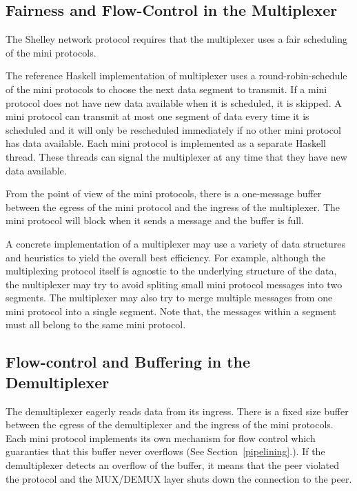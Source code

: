 \documentclass{report}
\newcommand{\hide}[1]{}
\theoremstyle{definition}{
  \newtheorem{lemma}{Lemma}[section] %
  \newtheorem{definition}[lemma]{Definition}
}
\theoremstyle{theorem}{
  \newtheorem{invariant}[lemma]{Invariant}
  \newtheorem{proofobligation}[lemma]{Proof Obligation}
}
\numberwithin{equation}{lemma}
\begin{document}
\subsection{Fairness and Flow-Control in the Multiplexer}
The Shelley network protocol requires that the multiplexer uses a fair scheduling of the mini protocols.

The reference Haskell implementation of multiplexer uses a round-robin-schedule of the mini protocols
to choose the next data segment to transmit.
If a mini protocol does not have new data available when it is scheduled, it is skipped.
A mini protocol can transmit at most one segment of data every time it is scheduled
and it will only be rescheduled immediately if no other mini protocol has data available.
Each mini protocol is implemented as a separate Haskell thread.
These threads can signal the multiplexer at any time that they have new data available.

From the point of view of the mini protocols, there is a one-message buffer between the egress of
the mini protocol and the ingress of the multiplexer.
The mini protocol will block when it sends a message and the buffer is full.

A concrete implementation of a multiplexer may use a variety of data structures and heuristics to
yield the overall best efficiency.
For example, although the multiplexing protocol itself is agnostic to the underlying structure of
the data, the multiplexer may try to avoid spliting small mini protocol messages into two segments.
The multiplexer may also try to merge multiple messages from one mini protocol into a
single segment.
Note that, the messages within a segment must all belong to the same mini protocol.

\subsection{Flow-control and Buffering in the Demultiplexer}
\label{mux-flow-control}
The demultiplexer eagerly reads data from its ingress.
There is a fixed size buffer between the egress of the demultiplexer and the ingress of
the mini protocols.
Each mini protocol implements its own mechanism for flow control which guaranties that this buffer
never overflows (See Section~\ref{pipelining}.).
If the demultiplexer detects an overflow of the buffer, it means that the peer violated the
protocol and the MUX/DEMUX layer shuts down the connection to the peer.

\hide{
The size of the buffers is listed in Table~\ref{demux-buffers}.
}
\end{document}
